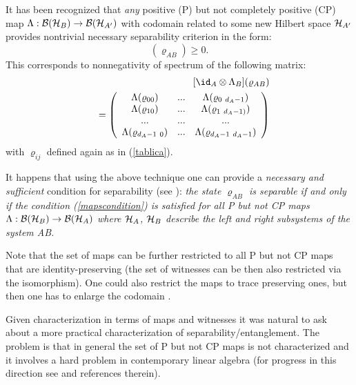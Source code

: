 \documentclass[rmp,12pt,preprint]{revtex4-2}
\begin{document}
It has been recognized that {\it any} positive (P) but not completely
positive (CP) map $\Lambda:{\cal B}({\cal H}_{B}) \rightarrow {\cal
  B}({\cal H}_{A'})$ with codomain related to some new Hilbert space
${\cal H}_{A'}$ provides nontrivial necessary separability criterion
in the form:
\begin{equation}
  [\id_{A} \otimes \Lambda_{B}](\varrho_{AB})\geq 0.
  \label{mapscondition}
\end{equation}
This corresponds to nonnegativity of spectrum of the following matrix:
\begin{eqnarray}
&& [\id _{A} \otimes \Lambda_{B}] (\varrho_{AB}) \nonumber \\
&& =\left(\begin{array}{ccc}
\Lambda(\varrho_{00}) &  ... & \Lambda(\varrho_{0 \ d_{A}-1})\\
\Lambda(\varrho_{10}) &  ... & \Lambda(\varrho_{1 \ d_{A}-1)})\\
 ...  &   ...   & ...  \\
\Lambda(\varrho_{d_{A}-1 \ 0}) &
... & \Lambda(\varrho_{d_{A}-1  \ d_{A}-1})
\end{array} \right)
\end{eqnarray}
with $\varrho_{ij}$ defined again as in (\ref{tablica}).

It happens that using the above technique one can provide a {\it
  necessary and sufficient} condition for separability (see
\cite{sep1996}): {\it the state $\varrho_{AB}$ is separable if and
  only if the condition (\ref{mapscondition}) is satisfied for all P
  but not CP maps $\Lambda: {\cal B}({\cal H}_{B}) \rightarrow {\cal
    B}({\cal H}_{A})$ where ${\cal H}_{A}$, ${\cal H}_{B}$ describe
  the left and right subsystems of the system AB.}

Note that the set of maps can be further restricted to all P but not
CP maps that are identity-preserving \cite{Pawel2001-NATO} (the set of
witnesses can be then also restricted via the isomorphism). One could
also restrict the maps to trace preserving ones, but then one has to
enlarge the codomain \cite{HHH02-permut}.

Given characterization in terms of maps and witnesses it was natural
to ask about a more practical characterization of
separability/entanglement. The problem is that in general the set of P
but not CP maps is not characterized and it involves a hard problem in
contemporary linear algebra (for progress in this direction see
\cite{Kossakowski} and references therein).
\end{document}
